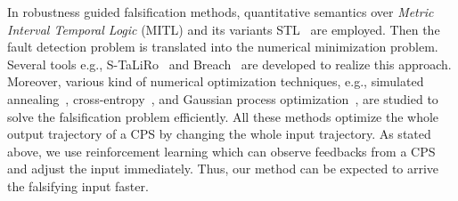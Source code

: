 In robustness guided falsification methods, quantitative semantics
over \emph{Metric Interval Temporal Logic} (MITL) and its variants STL~\cite{DBLP:conf/formats/MalerN04,DBLP:conf/formats/DonzeM10} are employed.  %
Then the fault detection problem is translated into the numerical minimization problem.
Several tools e.g., S-TaLiRo~\cite{DBLP:conf/tacas/AnnpureddyLFS11,DBLP:conf/cpsweek/HoxhaAF14a} and Breach~\cite{DBLP:conf/cav/Donze10} are developed to realize this approach.
Moreover, various kind of numerical optimization techniques, e.g., simulated annealing~\cite{DBLP:conf/allerton/AbbasF12},
cross-entropy~\cite{DBLP:conf/hybrid/SankaranarayananF12}, and
Gaussian process optimization~\cite{DBLP:journals/corr/BartocciBNS13,DBLP:journals/tcs/BartocciBNS15,DBLP:conf/rv/Akazaki16,DBLP:conf/ifm/SilvettiPB17}, are studied
to solve the falsification problem efficiently.
All these methods optimize the whole output trajectory of a CPS by changing the whole input trajectory.
As stated above, we use reinforcement learning which can observe feedbacks from a CPS and adjust the input immediately.
Thus, our method can be expected to arrive the falsifying input faster.

